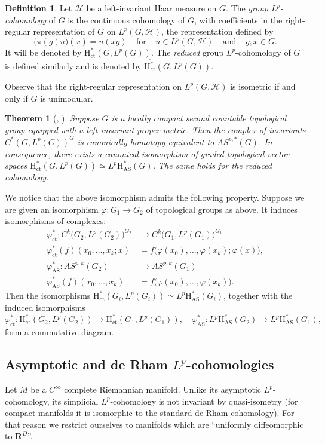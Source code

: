 \documentclass[JEP,XML,SOM,Unicode,published]{cedram}
\newcommand{\AS}{\mathrm{AS}}
\newcommand{\ct}{\mathrm{ct}}
\newcommand{\rH}{\mathrm{H}}
\newcommand{\RR}{\mathbf{R}}
\theoremstyle{plain}
\newtheorem{theorem}[equation]{Theorem}
\theoremstyle{remark}
\theoremstyle{definition}
\newtheorem{definition}[equation]{Definition}
\begin{document}
\begin{definition}
\label{semi-direct-definition2}
Let $\mathcal H$ be a left-invariant Haar measure on $G$. The \emph{group $L^p$\nobreakdash-cohomology} of $G$
is the continuous cohomology of $G$, with coefficients in
the right-regular representation of $G$ on $L^p(G, \mathcal H)$, \ie the representation defined by
\[\bigl(\pi(g) u\bigr)(x) = u(xg) ~~\text{~~for~~}~~ u \in L^p(G, \mathcal H) ~~\text{~~and~~}~~ g, x \in G.\]
It will be denoted by $\rH_\ct^*(G, L^p(G))$.
The \emph{reduced} group $L^p$\nobreakdash-cohomology of $G$ is defined similarly and is denoted by
$\overline{\rH_\ct^*}(G, L^p(G))$.
\end{definition}
Observe that the right-regular representation on $L^p(G, \mathcal H)$
is isometric if and only if $G$ is unimodular.
\begin{theorem}[{\cite[Th.\,10] {SaSc},
\cite[Th.\,3.6]{BR}}]\label{coho-theorem2}
Suppose $G$ is a locally compact second countable topological group equipped with a left-invariant proper metric.
Then the complex of invariants $C^*(G, L^p(G))^G$ is canonically homotopy equivalent to $AS^{p,*}(G)$.
In consequence, there exists a canonical isomorphism of graded topological vector spaces
$\rH_\ct^*(G, L^p(G)) \simeq L^p \rH_\AS^*(G)$.
The same holds for the reduced cohomology.
\end{theorem}
We notice that the above isomorphism admits the following property. Suppose we are given an isomorphism $\varphi: G_1 \to G_2$ of
topological groups as above. It induces isomorphisms of complexes:
\begin{align*}
\varphi_\ct^*: C^k\bigl(G_2, L^p(G_2)\bigr)^{G_2} &\to C^k\bigl(G_1, L^p(G_1)\bigr)^{G_1}\\
\varphi_\ct^*(f)(x_0, \dots, x_k; x) &= f\bigl(\varphi(x_0), \dots, \varphi(x_k); \varphi (x)\bigr),\\
\tag*{and}
\varphi_\AS^*: AS^{p,k}(G_2) &\to AS^{p,k}(G_1)\\
\varphi_\AS^*(f)(x_0, \dots, x_k) &= f\bigl(\varphi(x_0), \dots, \varphi(x_k)\bigr).
\end{align*}
Then the isomorphisms $\rH_\ct^*(G_i, L^p(G_i)) \simeq L^p \rH_\AS^*(G_i)$, together with the induced isomorphisms
\[
\varphi_\ct^*: \rH_\ct^*(G_2, L^p(G_2)) \to \rH_\ct^*(G_1, L^p(G_1)),\quad
\varphi_\AS^*: L^p \rH_\AS^*(G_2) \to L^p \rH_\AS^*(G_1),
\]
form a commutative diagram.

\subsection{Asymptotic and de Rham $L^p$-cohomologies}\label{coho-asymp}
Let $M$ be a $C^\infty$ complete Riemannian manifold. Unlike its asymptotic $L^p$\nobreakdash-cohomology,
its simplicial $L^p$\nobreakdash-cohomology is not invariant by quasi-isometry (\eg for compact manifolds it is isomorphic to the standard de Rham
cohomology).
For that reason we restrict ourselves to manifolds which are ``uniformly diffeomorphic to $\RR^D$''.
\end{document}

